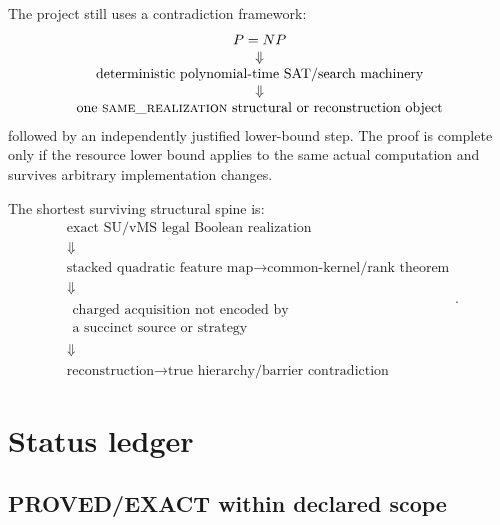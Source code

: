 \documentclass[11pt]{article}
\newcommand{\same}{\textnormal{\textsc{same\_realization}}}
\begin{document}
The project still uses a contradiction framework:
\[
\begin{gathered}
P=NP
\\[-1mm]\Downarrow\\[-1mm]
\text{deterministic polynomial-time SAT/search machinery}
\\[-1mm]\Downarrow\\[-1mm]
\text{one \same\ structural or reconstruction object}
\end{gathered}
\]
followed by an independently justified lower-bound step. The proof is complete only if the
resource lower bound applies to the same actual computation and survives arbitrary implementation
changes.

The shortest surviving structural spine is:
\[
\boxed{
\begin{gathered}
\text{exact SU/vMS legal Boolean realization}
\\[-1mm]\Downarrow\\[-1mm]
\text{stacked quadratic feature map}\to\text{common-kernel/rank theorem}
\\[-1mm]\Downarrow\\[-1mm]
\substack{\text{charged acquisition not encoded by}\\
\text{a succinct source or strategy}}
\\[-1mm]\Downarrow\\[-1mm]
\text{reconstruction}\to\text{true hierarchy/barrier contradiction}
\end{gathered}.
}
\]

\section{Status ledger}

\subsection{PROVED/EXACT within declared scope}
\end{document}
